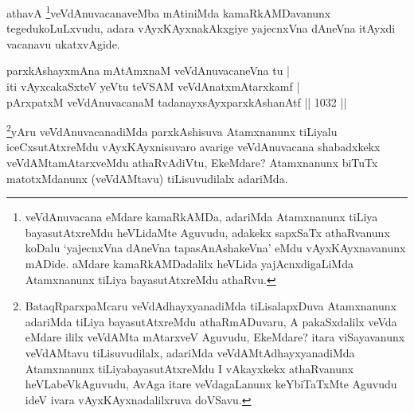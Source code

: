 \begin{artha}
athavA \footnote{veVdAnuvacana eMdare kamaRkAMDa, adariMda Atamxnanunx tiLiya bayasutAtxreMdu heVLidaMte Aguvudu, adakekx sapxSaTx athaRvanunx koDalu `yajecnxVna dAneVna tapasA\s nAshakeVna' eMdu vAyxKAyxnavanunx mADide. aMdare kamaRkAMDadalilx heVLida yajAcnxdigaLiMda Atamxnanunx tiLiya bayasutAtxreMdu athaRvu.}veVdAnuvacanaveMba mAtiniMda kamaRkAMDavanunx tegedukoLuLxvudu, adara vAyxKAyxnakAkxgiye yajecnxVna dAneVna itAyxdi vacanavu ukatxvAgide.
\end{artha}


\begin{shl}
parxkAshayxmAna mAtAmxnaM veVdAnuvacaneVna tu |\\
iti vAyxcakaSxteV yeVtu teVSAM veVdAnatxmAtarxkamf |\\
pArxpatxM veVdAnuvacanaM tadanayxsAyxparxkAshanAtf \hfill || 1032 ||
\end{shl}

\begin{artha}
\footnote{BataqRparxpaMcaru veVdAdhayxyanadiMda tiLisalapxDuva Atamxnanunx adariMda tiLiya bayasutAtxreMdu athaRmADuvaru, A pakaSxdalilx veVda eMdare ililx veVdAMta mAtarxveV Aguvudu, EkeMdare? itara viSayavanunx veVdAMtavu tiLisuvudilalx, adariMda veVdAMtAdhayxyanadiMda Atamxnanunx tiLiyabayasutAtxreMdu I vAkayxkekx athaRvanunx heVLabeVkAguvudu, AvAga itare veVdagaLanunx keYbiTaTxMte Aguvudu ideV ivara vAyxKAyxnadalilxruva doVSavu.}yAru veVdAnuvacanadiMda parxkAshisuva Atamxnanunx tiLiyalu iceCxsutAtxreMdu vAyxKAyxnisuvaro avarige veVdAnuvacana shabadxkekx veVdAMtamAtarxveMdu athaRvAdiVtu, EkeMdare? Atamxnanunx biTuTx matotxMdanunx (veVdAMtavu) tiLisuvudilalx adariMda.
\end{artha}
